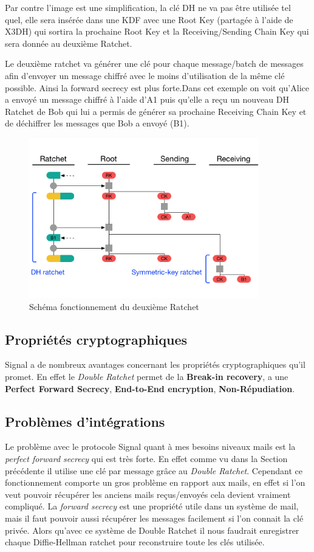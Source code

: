 Par contre l'image est une simplification, la clé DH ne va pas être utilisée tel quel, elle sera insérée dans une KDF avec une Root Key (partagée à l'aide de X3DH) qui sortira la prochaine Root Key et la Receiving/Sending Chain Key qui sera donnée au deuxième Ratchet.

Le deuxième ratchet va générer une clé pour chaque message/batch de messages afin d'envoyer un message chiffré avec le moins d'utilisation de la même clé possible. Ainsi la forward secrecy est plus forte.Dans cet exemple on voit qu'Alice a envoyé un message chiffré à l'aide d'A1 puis qu'elle a reçu un nouveau DH Ratchet de Bob qui lui a permis de générer sa prochaine Receiving Chain Key et de déchiffrer les messages que Bob a envoyé (B1).

\begin{figure}[h!]
	\centering
	\includegraphics[width=10cm]{images/secondRatchet.png}
	\caption{Schéma fonctionnement du deuxième Ratchet~\cite{doubleratchet}}
	\label{fig:signalSecond}
\end{figure}

\subsection{Propriétés cryptographiques}
Signal a de nombreux avantages concernant les propriétés cryptographiques qu'il promet. En effet le \textit{Double Ratchet} permet de la \textbf{Break-in recovery}, a une \textbf{Perfect Forward Secrecy}, \textbf{End-to-End encryption}, \textbf{Non-Répudiation}.
\subsection{Problèmes d'intégrations}
Le problème avec le protocole Signal quant à mes besoins niveaux mails est la \textit{perfect forward secrecy} qui est très forte. En effet comme vu dans la Section précédente il utilise une clé par message grâce au \textit{Double Ratchet}. Cependant ce fonctionnement comporte un gros problème en rapport aux mails, en effet si l'on veut pouvoir récupérer les anciens mails reçus/envoyés cela devient vraiment compliqué. La \textit{forward secrecy} est une propriété utile dans un système de mail, mais il faut pouvoir aussi récupérer les messages facilement si l'on connait la clé privée. Alors qu'avec ce système de Double Ratchet il nous faudrait enregistrer chaque Diffie-Hellman ratchet pour reconstruire toute les clés utilisée.
